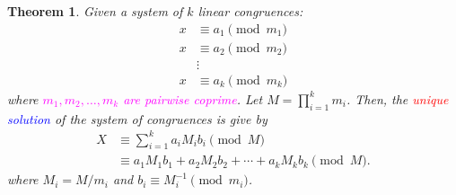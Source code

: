 \documentclass{article}
\newcommand{\inv}[1]{#1^{-1}}
\newtheorem*{theorem*}{Theorem}
\theoremstyle{definition}
\begin{document}
	\begin{tcolorbox}[colback=white,colframe=thmcolor,arc=5pt,title={\color{white}\bf Chinese Remainder Theorem ($\mathsf{CRT}$)}]
		\begin{theorem*}
			Given a system of $k$ linear congruences:
			\begin{align*}
			x&\equiv a_1 \pmod{m_1}\\
			x&\equiv a_2 \pmod{m_2}\\
			&\vdots \\
			x&\equiv a_k \pmod{m_k}
			\end{align*} where \textcolor{magenta}{$m_1,m_2,\dots, m_k$ are pairwise coprime}. Let $M=\prod_{i=1}^km_i$. Then, the \textcolor{red}{unique} \textcolor{blue}{solution} of the system of congruences is give by \begin{align*}
			X&\equiv\sum_{i=1}^ka_iM_ib_i\pmod{M}\\
			&\equiv a_1M_1b_1+a_2M_2b_2+\cdots+a_kM_kb_k\pmod{M}.
			\end{align*} where $M_i=M/m_i$ and $ b_i\equiv\inv{M_i}\pmod{m_i}$.
		\end{theorem*}
	\end{tcolorbox}
\end{document}

